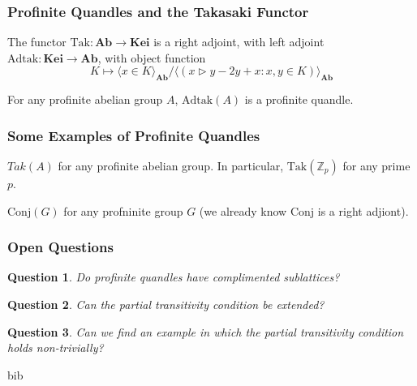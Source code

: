 \documentclass[10pt]{beamer}
\newcommand{\Z}{\mathbb{Z}}
\newcommand{\Conj}{\mathrm{Conj}} %
\newcommand{\thru}{\rhd} %
\newcommand{\Tak}{\mathrm{Tak}}
\newcommand{\Adtak}{\mathrm{Adtak}}
\theoremstyle{plain}
\newtheorem{question}{Question}
\begin{document}
    \begin{frame}
        \frametitle{Profinite Quandles and the Takasaki Functor}
        \begin{theorem}
            The functor $\Tak : \mathbf{Ab} \to \mathbf{Kei}$ is a right adjoint, with left adjoint $ \Adtak:\mathbf{Kei} \to \mathbf{Ab} $, with object function 
            \[K \mapsto \langle x\in K \rangle_{\mathbf{Ab}} / \langle(x\thru y - 2y + x: x,y\in K)\rangle_{\mathbf{Ab}} \]
        \end{theorem}

        
        \begin{corollary}
            For any profinite abelian group $A$, $ \Adtak(A) $ is a profinite quandle.
        \end{corollary}

    \end{frame}

    \begin{frame}
        \frametitle{Some Examples of Profinite Quandles}

        \begin{example}
            $Tak(A)$ for any profinite abelian group. In particular, $\Tak(\Z_p)$ for any prime $p$.
        \end{example}

        \begin{example}
            $ \Conj(G) $ for any profninite group $G$ (we already know $\Conj$ is a right adjiont).
        \end{example}
    \end{frame}

    \begin{frame}
        \frametitle{Open Questions}

        \begin{question}
            Do profinite quandles have complimented sublattices?
        \end{question}

        \begin{question}
            Can the partial transitivity condition be extended?
        \end{question}

        \begin{question}
            Can we find an example in which the partial transitivity condition holds non-trivially?
        \end{question}
    \end{frame}

    \begin{frame}[allowframebreaks]{bib}
        \printbibliography
    \end{frame}
\end{document}

